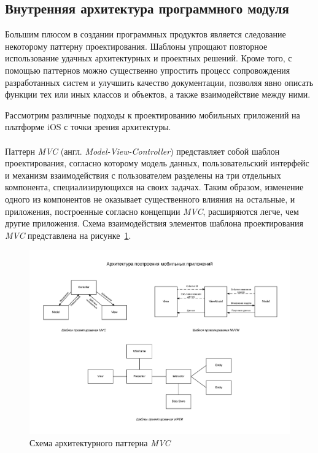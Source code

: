 \subsection{Внутренняя архитектура программного модуля}

Большим плюсом в создании программных продуктов является следование некоторому
паттерну проектирования. Шаблоны упрощают повторное использование удачных
архитектурных и проектных решений.
Кроме того, с помощью паттернов можно существенно
упростить процесс сопровождения разработанных систем и улучшить
качество документации, позволяя явно описать функции тех или иных
классов и объектов, а также взаимодействие между ними.

Рассмотрим различные подходы к проектированию мобильных приложений на платформе
iOS с точки зрения архитектуры.



\paragraph{}

Паттерн \textit{MVC} (англ. \textit{Model-View-Controller}) представляет
собой шаблон проектирования, согласно которому модель данных,
пользовательский интерфейс и механизм взаимодействия с пользователем разделены
на три отдельных компонента, специализирующихся на своих задачах.
Таким образом, изменение одного из компонентов не оказывает существенного
влияния на остальные, и приложения, построенные согласно концепции \textit{MVC},
расширяются легче, чем другие приложения.
Схема взаимодействия элементов шаблона проектирования \textit{MVC}
представлена на рисунке~\ref{fig:mvc}.
\begin{figure}[h!]
  \centering
  \includegraphics[width=140mm]{fig/mvc}
  \caption{Схема архитектурного паттерна \textit{MVC}}
  \label{fig:mvc}
\end{figure}

